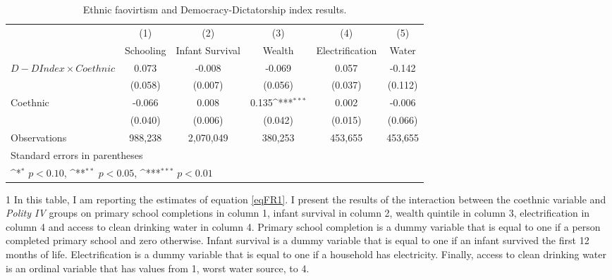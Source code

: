 \begin{table}[htbp]\centering
\def\sym#1{\ifmmode^{#1}\else\(^{#1}\)\fi}
\caption{Ethnic faovirtism and Democracy-Dictatorship index results.}

\begin{adjustbox}{max width=\textwidth}
\begin{threeparttable}[t]
  \centering
\begin{tabular}{l*{5}{c}}
\hline
                    &\multicolumn{1}{c}{(1)}&\multicolumn{1}{c}{(2)}&\multicolumn{1}{c}{(3)}&\multicolumn{1}{c}{(4)}&\multicolumn{1}{c}{(5)}\\
                    &\multicolumn{1}{c}{Schooling}&\multicolumn{1}{c}{Infant Survival}&\multicolumn{1}{c}{Wealth}&\multicolumn{1}{c}{Electrification}&\multicolumn{1}{c}{Water}\\
\midrule
$D-D Index \times Coethnic$&       0.073         &      -0.008         &      -0.069         &       0.057         &      -0.142         \\
                    &     (0.058)         &     (0.007)         &     (0.056)         &     (0.037)         &     (0.112)         \\
\addlinespace
Coethnic            &      -0.066         &       0.008         &       0.135\sym{***}&       0.002         &      -0.006         \\
                    &     (0.040)         &     (0.006)         &     (0.042)         &     (0.015)         &     (0.066)         \\
                    \midrule
Observations        &  988,238         & 2,070,049         &  380,253         &  453,655         &  453,655         \\
\hline
\multicolumn{6}{l}{\footnotesize Standard errors in parentheses}\\
\multicolumn{6}{l}{\footnotesize \sym{*} \(p<0.10\), \sym{**} \(p<0.05\), \sym{***} \(p<0.01\)}\\
\end{tabular}
\begin{footnotesize}
 \begin{tablenotes}
     \item[1] In this table, I am reporting the estimates of equation \ref{eqFR1}. I present the results of the interaction between the coethnic variable and \textit{Polity IV } groups on primary school completions in column 1, infant survival in column 2, wealth quintile in column 3, electrification in column 4 and access to clean drinking water in column 4. Primary school completion is a dummy variable that is equal to one if a person completed primary school and zero otherwise. Infant survival is a dummy variable that is equal to one if an infant survived the first 12 months of life. Electrification is a dummy variable that is equal to one if a household has electricity. Finally, access to clean drinking water is an ordinal variable that has values from 1, worst water source, to 4.

\end{tablenotes}
\end{footnotesize}
\end{threeparttable}
\end{adjustbox}
\end{table}
